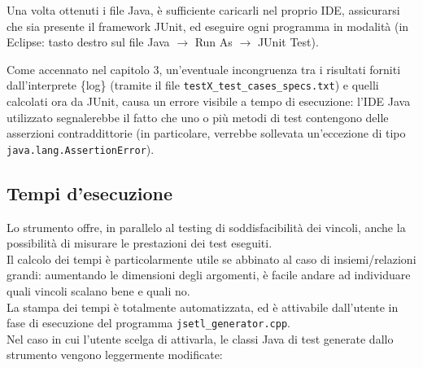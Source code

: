 Una volta ottenuti i file Java, è sufficiente caricarli nel proprio IDE, assicurarsi che sia presente il framework JUnit, ed eseguire ogni programma in modalità \emph{} (in Eclipse: tasto destro sul file Java $\rightarrow$ Run As $\rightarrow$ JUnit Test).

Come accennato nel capitolo 3, un'eventuale incongruenza tra i risultati forniti dall'interprete \{log\} (tramite il file \texttt{testX\_test\_cases\_specs.txt}) e quelli calcolati ora da JUnit, causa un errore visibile a tempo di esecuzione: l'IDE Java utilizzato segnalerebbe il fatto che uno o più metodi di test contengono delle asserzioni contraddittorie (in particolare, verrebbe sollevata un'eccezione di tipo \texttt{java.lang.AssertionError}).

\subsection{Tempi d'esecuzione}
Lo strumento offre, in parallelo al testing di soddisfacibilità dei vincoli, anche la possibilità di misurare le prestazioni dei test eseguiti.\\
Il calcolo dei tempi è particolarmente utile se abbinato al caso di insiemi/relazioni grandi: aumentando le dimensioni degli argomenti, è facile andare ad individuare quali vincoli scalano bene e quali no. \\

La stampa dei tempi è totalmente automatizzata, ed è attivabile dall'utente in fase di esecuzione del programma \texttt{jsetl\_generator.cpp}.\\
Nel caso in cui l'utente scelga di attivarla, le classi Java di test generate dallo strumento vengono leggermente modificate:\\

